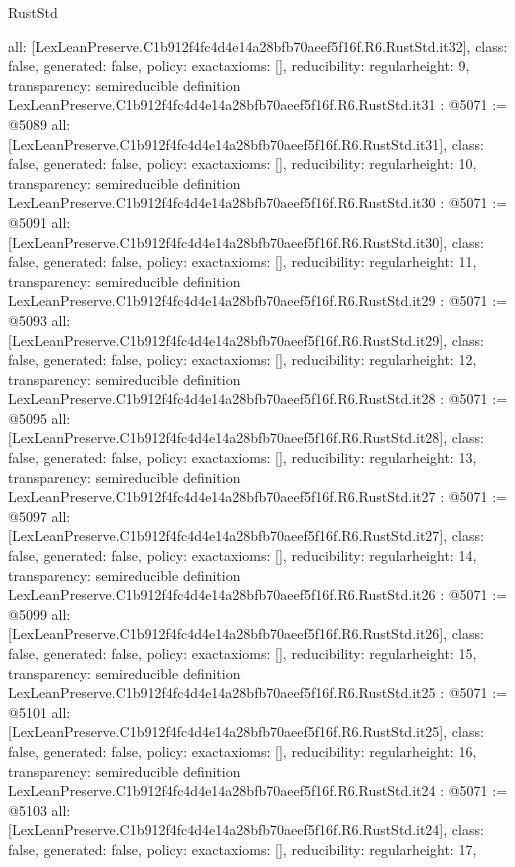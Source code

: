 \begin{lexlean}{RustStd}
\begin{coremodule}
{  all: [LexLeanPreserve.C1b912f4fc4d4e14a28bfb70aeef5f16f.R6.RustStd.it32],
  class: false,
  generated: false,
  policy: exact{axioms: []},
  reducibility: regular{height: 9},
  transparency: semireducible
}
definition LexLeanPreserve.C1b912f4fc4d4e14a28bfb70aeef5f16f.R6.RustStd.it31 : @5071 := @5089 {
  all: [LexLeanPreserve.C1b912f4fc4d4e14a28bfb70aeef5f16f.R6.RustStd.it31],
  class: false,
  generated: false,
  policy: exact{axioms: []},
  reducibility: regular{height: 10},
  transparency: semireducible
}
definition LexLeanPreserve.C1b912f4fc4d4e14a28bfb70aeef5f16f.R6.RustStd.it30 : @5071 := @5091 {
  all: [LexLeanPreserve.C1b912f4fc4d4e14a28bfb70aeef5f16f.R6.RustStd.it30],
  class: false,
  generated: false,
  policy: exact{axioms: []},
  reducibility: regular{height: 11},
  transparency: semireducible
}
definition LexLeanPreserve.C1b912f4fc4d4e14a28bfb70aeef5f16f.R6.RustStd.it29 : @5071 := @5093 {
  all: [LexLeanPreserve.C1b912f4fc4d4e14a28bfb70aeef5f16f.R6.RustStd.it29],
  class: false,
  generated: false,
  policy: exact{axioms: []},
  reducibility: regular{height: 12},
  transparency: semireducible
}
definition LexLeanPreserve.C1b912f4fc4d4e14a28bfb70aeef5f16f.R6.RustStd.it28 : @5071 := @5095 {
  all: [LexLeanPreserve.C1b912f4fc4d4e14a28bfb70aeef5f16f.R6.RustStd.it28],
  class: false,
  generated: false,
  policy: exact{axioms: []},
  reducibility: regular{height: 13},
  transparency: semireducible
}
definition LexLeanPreserve.C1b912f4fc4d4e14a28bfb70aeef5f16f.R6.RustStd.it27 : @5071 := @5097 {
  all: [LexLeanPreserve.C1b912f4fc4d4e14a28bfb70aeef5f16f.R6.RustStd.it27],
  class: false,
  generated: false,
  policy: exact{axioms: []},
  reducibility: regular{height: 14},
  transparency: semireducible
}
definition LexLeanPreserve.C1b912f4fc4d4e14a28bfb70aeef5f16f.R6.RustStd.it26 : @5071 := @5099 {
  all: [LexLeanPreserve.C1b912f4fc4d4e14a28bfb70aeef5f16f.R6.RustStd.it26],
  class: false,
  generated: false,
  policy: exact{axioms: []},
  reducibility: regular{height: 15},
  transparency: semireducible
}
definition LexLeanPreserve.C1b912f4fc4d4e14a28bfb70aeef5f16f.R6.RustStd.it25 : @5071 := @5101 {
  all: [LexLeanPreserve.C1b912f4fc4d4e14a28bfb70aeef5f16f.R6.RustStd.it25],
  class: false,
  generated: false,
  policy: exact{axioms: []},
  reducibility: regular{height: 16},
  transparency: semireducible
}
definition LexLeanPreserve.C1b912f4fc4d4e14a28bfb70aeef5f16f.R6.RustStd.it24 : @5071 := @5103 {
  all: [LexLeanPreserve.C1b912f4fc4d4e14a28bfb70aeef5f16f.R6.RustStd.it24],
  class: false,
  generated: false,
  policy: exact{axioms: []},
  reducibility: regular{height: 17},
}
\end{coremodule}
\end{lexlean}
